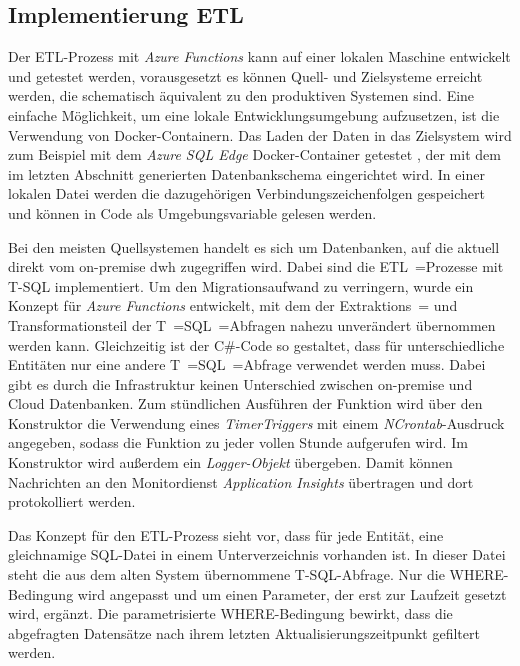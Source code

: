 \subsection{Implementierung ETL}
Der ETL-Prozess mit \textit{Azure Functions} kann auf einer lokalen Maschine entwickelt und getestet werden, vorausgesetzt es können Quell- und Zielsysteme erreicht werden, die schematisch äquivalent zu den produktiven Systemen sind. Eine einfache Möglichkeit, um eine lokale Entwicklungsumgebung aufzusetzen, ist die Verwendung von Docker-Containern. Das Laden der Daten in das Zielsystem wird zum Beispiel mit dem \textit{Azure SQL Edge} Docker-Container getestet \cite[vgl.][]{msdoc_22_sql_docker}, der mit dem im letzten Abschnitt generierten Datenbankschema eingerichtet wird. In einer lokalen Datei werden die dazugehörigen Verbindungszeichenfolgen gespeichert und können in Code als Umgebungsvariable gelesen werden.

Bei den meisten Quellsystemen handelt es sich um Datenbanken, auf die aktuell direkt vom on-premise \ac{dwh} zugegriffen wird. Dabei sind die ETL~=Prozesse mit T-SQL implementiert. Um den Migrationsaufwand zu verringern, wurde ein Konzept für \textit{Azure Functions} entwickelt, mit dem der Extraktions~= und Transformationsteil der T~=SQL~=Abfragen nahezu unverändert übernommen werden kann. Gleichzeitig ist der C\#-Code so gestaltet, dass für unterschiedliche Entitäten nur eine andere T~=SQL~=Abfrage verwendet werden muss. Dabei gibt es durch die Infrastruktur keinen Unterschied zwischen on-premise und Cloud Datenbanken. Zum stündlichen Ausführen der Funktion wird über den Konstruktor die Verwendung eines \textit{TimerTriggers} mit einem \textit{NCrontab}-Ausdruck angegeben, sodass die Funktion zu jeder vollen Stunde aufgerufen wird. Im Konstruktor wird außerdem ein \textit{Logger-Objekt} übergeben. Damit können Nachrichten an den Monitordienst \textit{Application Insights} übertragen und dort protokolliert werden.

Das Konzept für den ETL-Prozess sieht vor, dass für jede Entität, eine gleichnamige SQL-Datei in einem Unterverzeichnis vorhanden ist. In dieser Datei steht die aus dem alten System übernommene T-SQL-Abfrage. Nur die WHERE-Bedingung wird angepasst und um einen Parameter, der erst zur Laufzeit gesetzt wird, ergänzt. Die parametrisierte WHERE-Bedingung bewirkt, dass die abgefragten Datensätze nach ihrem letzten Aktualisierungszeitpunkt gefiltert werden.

